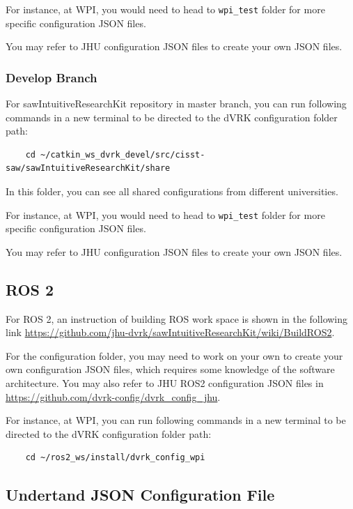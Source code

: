 For instance, at WPI, you would need to head to \texttt{wpi\_test} folder for more specific configuration JSON files.

You may refer to JHU configuration JSON files to create your own JSON files.

\subsubsection{Develop Branch}

For sawIntuitiveResearchKit repository in master branch, you can run following commands in a new terminal to be directed to the dVRK configuration folder path:

\begin{verbatim}
    cd ~/catkin_ws_dvrk_devel/src/cisst-saw/sawIntuitiveResearchKit/share
\end{verbatim}

In this folder, you can see all shared configurations from different universities. 

For instance, at WPI, you would need to head to \texttt{wpi\_test} folder for more specific configuration JSON files.

You may refer to JHU configuration JSON files to create your own JSON files.

\subsection{ROS 2}

For ROS 2, an instruction of building ROS work space is shown in the following link \url{https://github.com/jhu-dvrk/sawIntuitiveResearchKit/wiki/BuildROS2}.

For the configuration folder, you may need to work on your own to create your own configuration JSON files, which requires some knowledge of the software architecture. You may also refer to JHU ROS2 configuration JSON files in \url{https://github.com/dvrk-config/dvrk_config_jhu}. 

For instance, at WPI, you can run following commands in a new terminal to be directed to the dVRK configuration folder path:

\begin{verbatim}
    cd ~/ros2_ws/install/dvrk_config_wpi
\end{verbatim}

\subsection{Undertand JSON Configuration File}

